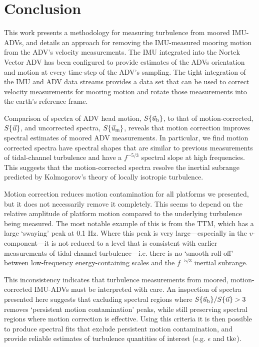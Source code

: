 
\section{Conclusion}
\label{sec:conclusion}
 
This work presents a methodology for measuring turbulence from moored IMU-ADVs, and details an approach for removing the IMU-measured mooring motion from the ADV's velocity measurements. The IMU integrated into the Nortek Vector ADV has been configured to provide estimates of the ADVs orientation and motion at every time-step of the ADV's sampling. The tight integration of the IMU and ADV data streams provides a data set that can be used to correct velocity measurements for mooring motion and rotate those measurements into the earth's reference frame. 

Comparison of spectra of ADV head motion, $S\{\vec{u}_\mathrm{h}\}$, to that of motion-corrected, $S\{\vec{u}\}$, and uncorrected spectra, $S\{\vec{u}_\mathrm{m}\}$, reveals that motion correction improves spectral estimates of moored ADV measurements. In particular, we find motion corrected spectra have spectral shapes that are similar to previous measurements of tidal-channel turbulence and have a $f^{-5/3}$ spectral slope at high frequencies. This suggests that the motion-corrected spectra resolve the inertial subrange predicted by Kolmogorov's theory of locally isotropic turbulence.

Motion correction reduces motion contamination for all platforms we presented, but it does not necessarily remove it completely. This seems to depend on the relative amplitude of platform motion compared to the underlying turbulence being measured. The most notable example of this is from the TTM, which has a large `swaying' peak at 0.1 Hz. Where this peak is very large---especially in the $v$-component---it is not reduced to a level that is consistent with earlier measurements of tidal-channel turbulence---i.e. there is no `smooth roll-off' between low-frequency energy-containing scales and the $f^{-5/3}$ inertial subrange.

This inconsistency indicates that turbulence measurements from moored, motion-corrected IMU-ADVs must be interpreted with care. An inspection of spectra presented here suggests that excluding spectral regions where $S\{\vec{u}_\mathrm{h}\} / S\{\vec{u}\} > 3$ removes `persistent motion contamination' peaks, while still preserving spectral regions where motion correction is effective. Using this criteria it is then possible to produce spectral fits that exclude persistent motion contamination, and provide reliable estimates of turbulence quantities of interest (e.g. $\epsilon$ and $\mathrm{tke}$).

